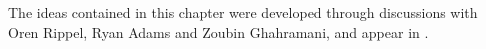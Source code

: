 The ideas contained in this chapter were developed through discussions with Oren Rippel, Ryan Adams and Zoubin Ghahramani, and appear in \citep{DuvRipAdaGha14}.












